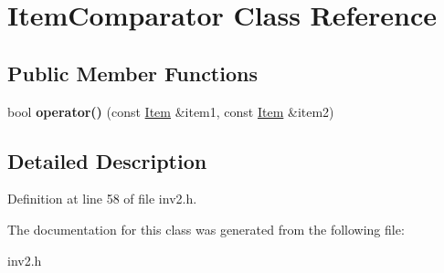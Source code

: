 \hypertarget{class_item_comparator}{}\section{Item\+Comparator Class Reference}
\label{class_item_comparator}
\subsection*{Public Member Functions}
\begin{DoxyCompactItemize}
\item 
\hypertarget{class_item_comparator_aed204fa45ce29576828361be79c016ec}{}\label{class_item_comparator_aed204fa45ce29576828361be79c016ec} 
bool {\bfseries operator()} (const \hyperlink{class_item}{Item} \&item1, const \hyperlink{class_item}{Item} \&item2)
\end{DoxyCompactItemize}


\subsection{Detailed Description}


Definition at line 58 of file inv2.\+h.



The documentation for this class was generated from the following file\+:\begin{DoxyCompactItemize}
\item 
inv2.\+h\end{DoxyCompactItemize}
